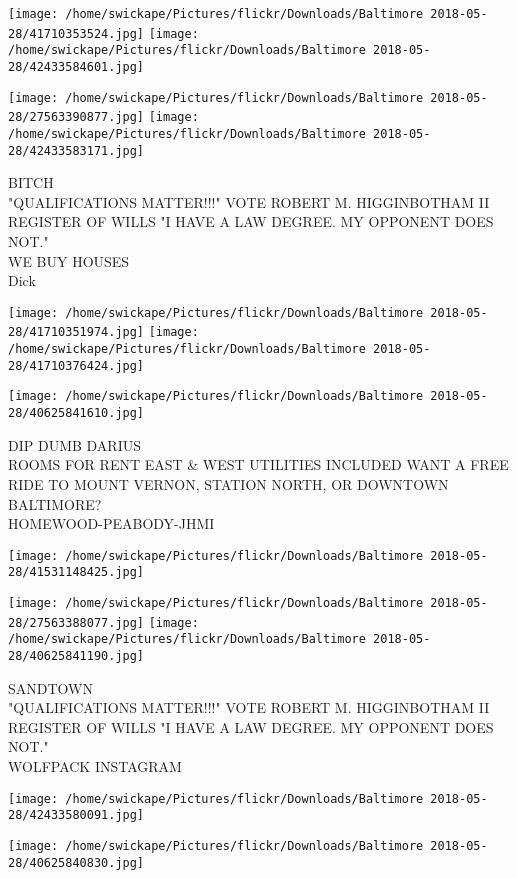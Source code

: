 \documentclass[10pt,letterpaper]{article}
\begin{document}
\texttt{[image: /home/swickape/Pictures/flickr/Downloads/Baltimore 2018-05-28/41710353524.jpg]}
\texttt{[image: /home/swickape/Pictures/flickr/Downloads/Baltimore 2018-05-28/42433584601.jpg]}

\texttt{[image: /home/swickape/Pictures/flickr/Downloads/Baltimore 2018-05-28/27563390877.jpg]}
\texttt{[image: /home/swickape/Pictures/flickr/Downloads/Baltimore 2018-05-28/42433583171.jpg]}

BITCH\\
"QUALIFICATIONS MATTER!!!" VOTE ROBERT M. HIGGINBOTHAM II REGISTER OF WILLS "I HAVE A LAW DEGREE.  MY OPPONENT DOES NOT."\\
WE BUY HOUSES\\
Dick
\pagebreak

\texttt{[image: /home/swickape/Pictures/flickr/Downloads/Baltimore 2018-05-28/41710351974.jpg]}
\texttt{[image: /home/swickape/Pictures/flickr/Downloads/Baltimore 2018-05-28/41710376424.jpg]}

\texttt{[image: /home/swickape/Pictures/flickr/Downloads/Baltimore 2018-05-28/40625841610.jpg]}

DIP DUMB DARIUS\\
ROOMS FOR RENT EAST \& WEST UTILITIES INCLUDED WANT A FREE RIDE TO MOUNT VERNON, STATION NORTH, OR DOWNTOWN BALTIMORE?\\
HOMEWOOD{-}PEABODY{-}JHMI
\pagebreak

\texttt{[image: /home/swickape/Pictures/flickr/Downloads/Baltimore 2018-05-28/41531148425.jpg]}

\vspace{0.25in}
\texttt{[image: /home/swickape/Pictures/flickr/Downloads/Baltimore 2018-05-28/27563388077.jpg]}
\texttt{[image: /home/swickape/Pictures/flickr/Downloads/Baltimore 2018-05-28/40625841190.jpg]}

SANDTOWN\\
"QUALIFICATIONS MATTER!!!" VOTE ROBERT M. HIGGINBOTHAM II REGISTER OF WILLS "I HAVE A LAW DEGREE.  MY OPPONENT DOES NOT."\\
WOLFPACK INSTAGRAM
\pagebreak

\texttt{[image: /home/swickape/Pictures/flickr/Downloads/Baltimore 2018-05-28/42433580091.jpg]}

\vspace{0.25in}
\texttt{[image: /home/swickape/Pictures/flickr/Downloads/Baltimore 2018-05-28/40625840830.jpg]}
\end{document}
